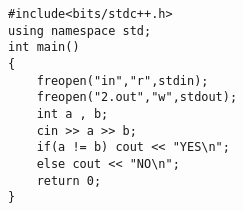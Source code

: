 \documentclass[E:/GsjzTle/main/main.tex]{subfiles}
\begin{document}
\begin{lstlisting}
#include<bits/stdc++.h>
using namespace std;
int main()
{
	freopen("in","r",stdin);
	freopen("2.out","w",stdout);
	int a , b;
	cin >> a >> b;
	if(a != b) cout << "YES\n";
	else cout << "NO\n";
	return 0;
}
\end{lstlisting}
\end{document}
